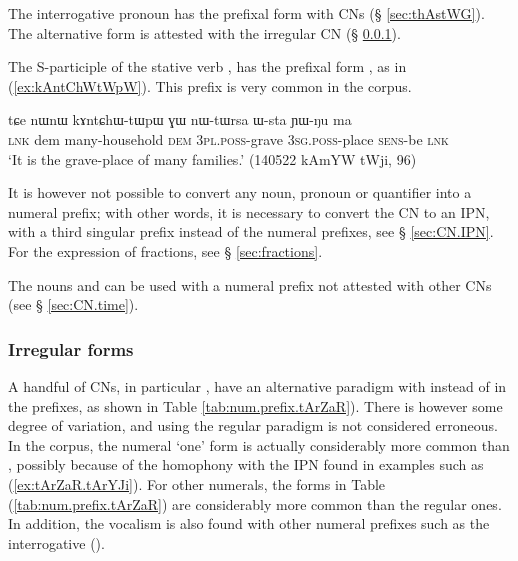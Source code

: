 The interrogative pronoun  has the prefixal form  with CNs (§  \ref{sec:thAstWG}). The alternative form  is attested with the irregular  CN  (§ \ref{sec:irregular.numeral.prefixes}).

The S-participle   of the stative verb ,  has the prefixal form , as in (\ref{ex:kAntChWtWpW}). This prefix is very common in the corpus.

\begin{exe}
\ex \label{ex:kAntChWtWpW}
 \gll  tɕe nɯnɯ kɤntɕhɯ-tɯpɯ ɣɯ nɯ-tɯrsa ɯ-sta ɲɯ-ŋu ma \\
 \textsc{lnk} dem many-household \textsc{dem} \textsc{3pl}.\textsc{poss}-grave \textsc{3sg}.\textsc{poss}-place \textsc{sens}-be \textsc{lnk} \\
 \glt `It is the grave-place of many families.' (140522 kAmYW tWji, 96)
\end{exe}

It is however not possible to convert any noun, pronoun or quantifier into a numeral prefix; with other words, it is necessary to convert the CN to an IPN, with a third singular  prefix instead of the numeral prefixes, see § \ref{sec:CN.IPN}. For the expression of fractions, see § \ref{sec:fractions}.

The nouns  and  can be used with a numeral prefix  not attested with other CNs (see § \ref{sec:CN.time}).

\subsubsection{Irregular forms} \label{sec:irregular.numeral.prefixes}
A handful of CNs, in particular , have an alternative paradigm with  instead of  in the prefixes, as shown in Table \ref{tab:num.prefix.tArZaR}). There is however some degree of variation, and using the regular paradigm is not considered erroneous. In the corpus, the numeral `one' form  is actually considerably more common than , possibly because of the homophony with the IPN  found in examples such as (\ref{ex:tArZaR.tArYJi}). For other numerals, the forms in Table (\ref{tab:num.prefix.tArZaR}) are considerably more common than the regular ones. In addition, the  vocalism is also found with other numeral prefixes such as the interrogative ().

